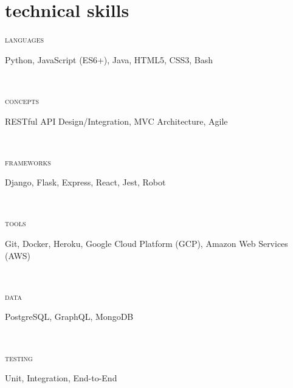 \documentclass[letterpaper, 11pt]{article}
\newcommand{\skillentry}[2]{
    \begin{minipage}[t]{.15\linewidth}
        \hfill \textsc{#1}
        \end{minipage}
        \hfill\vline\hfill
        \begin{minipage}[t]{.80\linewidth}
        \small{#2}
        \end{minipage}\\
    }
\begin{document}
    \section{technical skills}

    \skillentry{languages}{Python, JavaScript (ES6+), Java, HTML5, CSS3, Bash}
    \skillentry{concepts}{RESTful API Design/Integration, MVC Architecture, Agile}
    \skillentry{frameworks}{Django, Flask, Express, React, Jest, Robot}
    \skillentry{tools}{Git, Docker, Heroku, Google Cloud Platform (GCP), Amazon Web Services (AWS) }
    \skillentry{data}{PostgreSQL, GraphQL, MongoDB}
    \skillentry{testing}{Unit, Integration, End-to-End}
\end{document}

